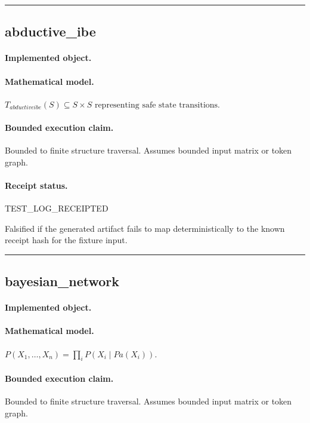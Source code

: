 \vspace{1em}\hrule\vspace{1em}
\subsection{abductive\_ibe}
\paragraph{Implemented object.} 
\paragraph{Mathematical model.} $T_{abductiveibe}(S) \subseteq S \times S \text{ representing safe state transitions}.$
\paragraph{Bounded execution claim.} Bounded to finite structure traversal. Assumes bounded input matrix or token graph.
\paragraph{Receipt status.} TEST\_LOG\_RECEIPTED
\begin{falsifier}
Falsified if the generated artifact fails to map deterministically to the known receipt hash for the fixture input.
\end{falsifier}

\vspace{1em}\hrule\vspace{1em}
\subsection{bayesian\_network}
\paragraph{Implemented object.} 
\paragraph{Mathematical model.} $P(X_1,\ldots,X_n) = \prod_i P(X_i\mid Pa(X_i)).$
\paragraph{Bounded execution claim.} Bounded to finite structure traversal. Assumes bounded input matrix or token graph.
